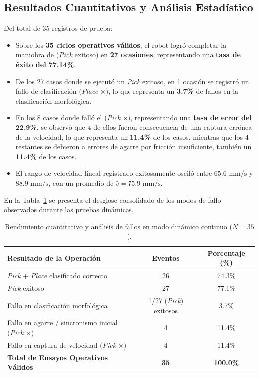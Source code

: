 \documentclass[12pt, a4paper]{report}
\begin{document}
\subsection{Resultados Cuantitativos y Análisis Estadístico}
Del total de 35 registros de prueba:
\begin{itemize}
    \item Sobre los \textbf{35 ciclos operativos válidos}, el robot logró completar la maniobra de (\textit{Pick} exitoso) en \textbf{27 ocasiones}, representando una \textbf{tasa de éxito del 77.14\%}.
    \item De los 27 casos donde se ejecutó un \textit{Pick} exitoso, en 1 ocasión se registró un fallo de clasificación (\textit{Place} $\times$), lo que representa un \textbf{3.7\%} de fallos en la clasificación morfológica.
    \item En los 8 casos donde falló el (\textit{Pick} $\times$), representando una \textbf{tasa de error del 22.9\%}, se observó que 4 de ellos fueron consecuencia de una captura errónea de la velocidad, lo que representa un \textbf{11.4\%} de los casos, mientras que los 4 restantes se debieron a errores de agarre por fricción insuficiente, también un \textbf{11.4\%} de los casos.
    \item El rango de velocidad lineal registrado exitosamente osciló entre $65.6\text{ mm/s}$ y $88.9\text{ mm/s}$, con un promedio de $\bar{v} = 75.9\text{ mm/s}$.
\end{itemize}

En la Tabla~\ref{tab:resultados_dinamico} se presenta el desglose consolidado de los modos de fallo observados durante las pruebas dinámicas.

\begin{table}[H]
\centering
\begin{tabular}{lcc}
\toprule
\textbf{Resultado de la Operación} & \textbf{Eventos} & \textbf{Porcentaje (\%)} \\
\midrule
\textit{Pick} + \textit{Place} clasificado correcto & 26 & 74.3\% \\
\textit{Pick} exitoso & 27 & 77.1\% \\
Fallo en clasificación morfológica & 1/27 (\textit{Pick}) exitosos & 3.7\% \\
Fallo en agarre / sincronismo inicial (\textit{Pick} $\times$) & 4 & 11.4\% \\
Fallo en captura de velocidad (\textit{Pick} $\times$) & 4 & 11.4\% \\
\midrule
\textbf{Total de Ensayos Operativos Válidos} & \textbf{35} & \textbf{100.0\%} \\
\bottomrule
\end{tabular}
\caption{Rendimiento cuantitativo y análisis de fallos en modo dinámico continuo ($N = 35$).}
\label{tab:resultados_dinamico}
\end{table}
\end{document}
